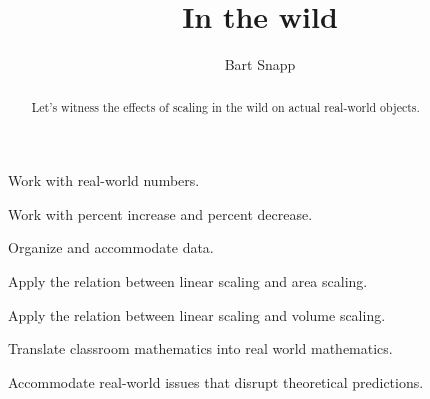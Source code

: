 \documentclass[nooutcomes,noauthor,12pt,]{ximera}
\title{In the wild}
\author{Bart Snapp}
\begin{document}
\begin{abstract}
  Let's witness the effects of scaling in the wild on actual
  real-world objects.
\end{abstract}
\maketitle


\begin{listOutcomes}
\item Work with real-world numbers.
\item Work with percent increase and percent decrease.
\item Organize and accommodate data.
\item Apply the relation between linear scaling and area scaling.
\item Apply the relation between linear scaling and volume scaling.
\item Translate classroom mathematics into real world mathematics. 
\item Accommodate real-world issues that disrupt theoretical predictions.
\end{listOutcomes}





\mynewpage



\end{document}
